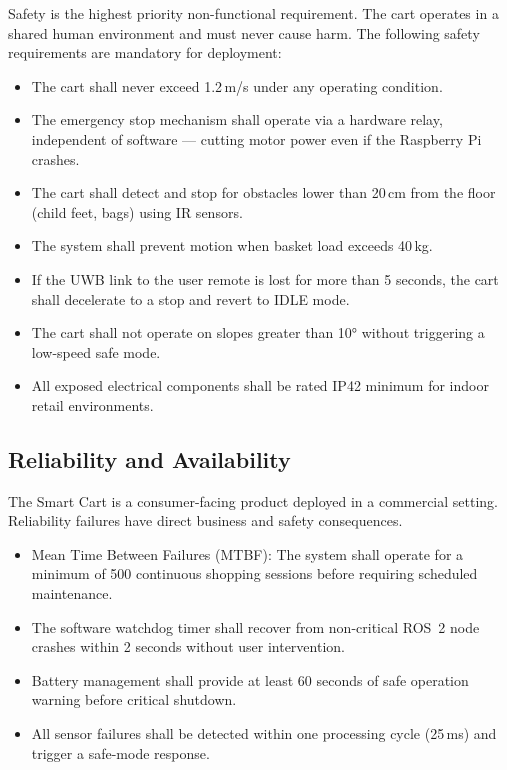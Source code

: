 Safety is the highest priority non-functional requirement. The cart
operates in a shared human environment and must never cause harm. The
following safety requirements are mandatory for deployment:
\begin{itemize}
  \item The cart shall never exceed 1.2\,m/s under any operating condition.
  \item The emergency stop mechanism shall operate via a hardware relay, independent of software --- cutting motor power even if the Raspberry Pi crashes.
  \item The cart shall detect and stop for obstacles lower than 20\,cm from the floor (child feet, bags) using IR sensors.
  \item The system shall prevent motion when basket load exceeds 40\,kg.
  \item If the UWB link to the user remote is lost for more than 5 seconds, the cart shall decelerate to a stop and revert to IDLE mode.
  \item The cart shall not operate on slopes greater than 10° without triggering a low-speed safe mode.
  \item All exposed electrical components shall be rated IP42 minimum for indoor retail environments.
\end{itemize}

\subsection{Reliability and Availability}

The Smart Cart is a consumer-facing product deployed in a commercial
setting. Reliability failures have direct business and safety consequences.
\begin{itemize}
  \item Mean Time Between Failures (MTBF): The system shall operate for a minimum of 500 continuous shopping sessions before requiring scheduled maintenance.
  \item The software watchdog timer shall recover from non-critical ROS~2 node crashes within 2 seconds without user intervention.
  \item Battery management shall provide at least 60 seconds of safe operation warning before critical shutdown.
  \item All sensor failures shall be detected within one processing cycle (25\,ms) and trigger a safe-mode response.
\end{itemize}

